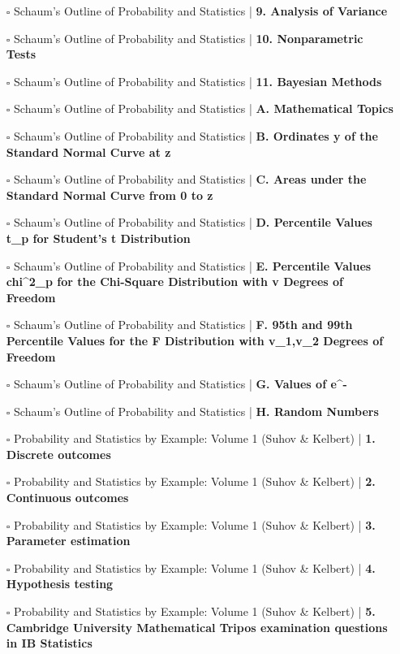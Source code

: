 \documentclass[a4, landscape, 12pt]{article}
\newcommand{\checkbox}{$\square$}%
\begin{document}
\begin{itemize}
{}
\item [\checkbox] Schaum's Outline of Probability and Statistics  | \textbf{9. Analysis of Variance
}
\item [\checkbox] Schaum's Outline of Probability and Statistics  | \textbf{10. Nonparametric Tests
}
\item [\checkbox] Schaum's Outline of Probability and Statistics  | \textbf{11. Bayesian Methods
}
\item [\checkbox] Schaum's Outline of Probability and Statistics  | \textbf{A. Mathematical Topics
}
\item [\checkbox] Schaum's Outline of Probability and Statistics  | \textbf{B. Ordinates y of the Standard Normal Curve at z
}
\item [\checkbox] Schaum's Outline of Probability and Statistics  | \textbf{C. Areas under the Standard Normal Curve from 0 to z
}
\item [\checkbox] Schaum's Outline of Probability and Statistics  | \textbf{D. Percentile Values t_p for Student's t Distribution
}
\item [\checkbox] Schaum's Outline of Probability and Statistics  | \textbf{E. Percentile Values chi^2_p for the Chi-Square Distribution with v Degrees of Freedom
}
\item [\checkbox] Schaum's Outline of Probability and Statistics  | \textbf{F. 95th and 99th Percentile Values for the F Distribution with v_1,v_2 Degrees of Freedom
}
\item [\checkbox] Schaum's Outline of Probability and Statistics  | \textbf{G. Values of e^{-\lambda}
}
\item [\checkbox] Schaum's Outline of Probability and Statistics  | \textbf{H. Random Numbers
}
\item [\checkbox] Probability and Statistics by Example: Volume 1 (Suhov & Kelbert)  | \textbf{1. Discrete outcomes
}
\item [\checkbox] Probability and Statistics by Example: Volume 1 (Suhov & Kelbert)  | \textbf{2. Continuous outcomes
}
\item [\checkbox] Probability and Statistics by Example: Volume 1 (Suhov & Kelbert)  | \textbf{3. Parameter estimation
}
\item [\checkbox] Probability and Statistics by Example: Volume 1 (Suhov & Kelbert)  | \textbf{4. Hypothesis testing
}
\item [\checkbox] Probability and Statistics by Example: Volume 1 (Suhov & Kelbert)  | \textbf{5. Cambridge University Mathematical Tripos examination questions in IB Statistics
}
\end{itemize}
\end{document}
